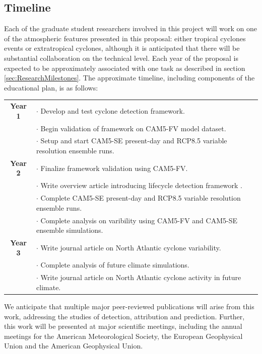 \documentclass[11pt]{article}
\begin{document}
\subsection{Timeline} \label{sec:Timeline}

Each of the graduate student researchers involved in this project will work on one of the atmospheric features presented in this proposal: either tropical cyclones events or extratropical cyclones, although it is anticipated that there will be substantial collaboration on the technical level.  Each year of the proposal is expected to be approximately associated with one task as described in section \ref{sec:ResearchMilestones}.  The approximate timeline, including components of the educational plan, is as follows:

\begin{tabularx}{\textwidth}{cX}
\hline
\textbf{Year 1} & $\cdot$ Develop and test cyclone detection framework. \\
& $\cdot$ Begin validation of framework on CAM5-FV model dataset.  \\
& $\cdot$ Setup and start CAM5-SE present-day and RCP8.5 variable resolution ensemble runs. \\
\hline
\textbf{Year 2} & $\cdot$ Finalize framework validation using CAM5-FV. \\
& $\cdot$ Write overview article introducing lifecycle detection framework .\\
& $\cdot$ Complete CAM5-SE present-day and RCP8.5 variable resolution ensemble runs. \\
& $\cdot$ Complete analysis on varibility using CAM5-FV and CAM5-SE ensemble simulations. \\
\hline
\textbf{Year 3} & $\cdot$ Write journal article on North Atlantic cyclone variability. \\
& $\cdot$ Complete analysis of future climate simulations. \\
& $\cdot$ Write journal article on North Atlantic cyclone activity in future climate. \\
\hline
\end{tabularx}

We anticipate that multiple major peer-reviewed publications will arise from this work, addressing the studies of detection, attribution and prediction. Further, this work will be presented at major scientific meetings, including the annual meetings for the American Meteorological Society, the European Geophysical Union and the American Geophysical Union.

{\vbox{}}

\end{document}

